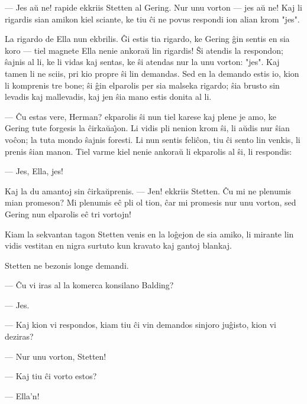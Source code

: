  --- Jes a\u u ne! rapide ekkriis Stetten al Gering. Nur unu vorton
 --- jes a\u u ne! Kaj li rigardis sian amikon kiel sciante, ke tiu \^ci
ne povus respondi ion alian krom "jes".

   La rigardo de Ella nun ekbrilis. \^Gi estis tia rigardo, ke Gering
\^gin sentis en sia koro --- tiel magnete Ella nenie ankora\u u lin
rigardis! \^Si atendis la respondon; \^sajnis al li, ke li vidas kaj
sentas, ke \^si atendas nur la unu vorton: "jes". Kaj tamen li ne
sciis, pri kio propre \^si lin demandas. Sed en la demando estis io,
kion li komprenis tre bone; \^si \^gin elparolis per sia malseka
rigardo; \^sia brusto sin levadis kaj mallevadis, kaj jen \^sia mano
estis donita al li.

 --- \^Cu estas vere, Herman? ekparolis \^si nun tiel karese kaj plene je
amo, ke Gering tute forgesis la \^cirka\u ua\^{\j}on. Li vidis pli
nenion krom \^si, li a\u udis nur \^sian vo\^con; la tuta mondo
\^sajnis foresti. Li nun sentis feli\^con, tiu \^ci sento lin
venkis, li prenis \^sian manon. Tiel varme kiel nenie ankora\u u li
ekparolis al \^si, li respondis:

 --- Jes, Ella, jes!

   Kaj la du amantoj sin \^cirka\u uprenis. --- Jen! ekkriis Stetten. \^Cu mi
ne plenumis mian promeson? Mi plenumis e\^c pli ol tion, \^car mi
promesis nur unu vorton, sed Gering nun elparolis e\^c tri vortojn!

   Kiam la sekvantan tagon Stetten venis en la lo\^gejon de sia amiko,
li mirante lin vidis vestitan en nigra surtuto kun kravato kaj
gantoj blankaj.

   Stetten ne bezonis longe demandi.

 --- \^Cu vi iras al la komerca konsilano Balding?

 --- Jes.

 --- Kaj kion vi respondos, kiam tiu \^ci vin demandos sinjoro ju\^gisto,
kion vi deziras?

 --- Nur unu vorton, Stetten!

 --- Kaj tiu \^ci vorto estos?

 --- Ella'n!

\smallrule{}
